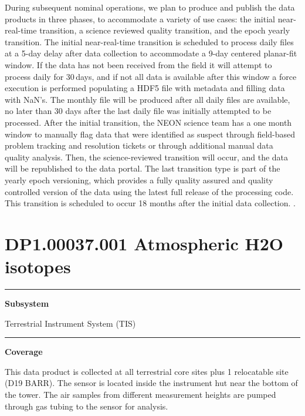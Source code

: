 \documentclass[]{article}
\begin{document}
During subsequent nominal operations, we plan to produce and publish the
data products in three phases, to accommodate a variety of use cases:
the initial near-real-time transition, a science reviewed quality
transition, and the epoch yearly transition. The initial near-real-time
transition is scheduled to process daily files at a 5-day delay after
data collection to accommodate a 9-day centered planar-fit window. If
the data has not been received from the field it will attempt to process
daily for 30\,days, and if not all data is available after this window a
force execution is performed populating a HDF5 file with metadata and
filling data with NaN's. The monthly file will be produced after all
daily files are available, no later than 30 days after the last daily
file was initially attempted to be processed. After the initial
transition, the NEON science team has a one month window to manually
flag data that were identified as suspect through field-based problem
tracking and resolution tickets or through additional manual data
quality analysis. Then, the science-reviewed transition will occur, and
the data will be republished to the data portal. The last transition
type is part of the yearly epoch versioning, which provides a fully
quality assured and quality controlled version of the data using the
latest full release of the processing code. This transition is scheduled
to occur 18 months after the initial data collection. \newpage
.

\section{DP1.00037.001 Atmospheric H2O
isotopes}\label{dp1.00037.001-atmospheric-h2o-isotopes}

\begin{center}\rule{0.5\linewidth}{\linethickness}\end{center}

\textbf{Subsystem}

Terrestrial Instrument System (TIS)

\begin{center}\rule{0.5\linewidth}{\linethickness}\end{center}

\textbf{Coverage}

This data product is collected at all terrestrial core sites plus 1
relocatable site (D19 BARR). The sensor is located inside the instrument
hut near the bottom of the tower. The air samples from different
measurement heights are pumped through gas tubing to the sensor for
analysis.
\end{document}
